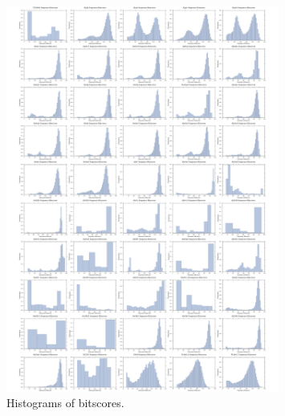 \begin{figure} %
\centering
\includegraphics[width=0.8\textwidth]{figs/dualbirth-bit-hists}
\caption[Histograms of Bitscores]
{Histograms of bitscores.}
\label{fig:dualbirth-bit-hists}
\end{figure}

